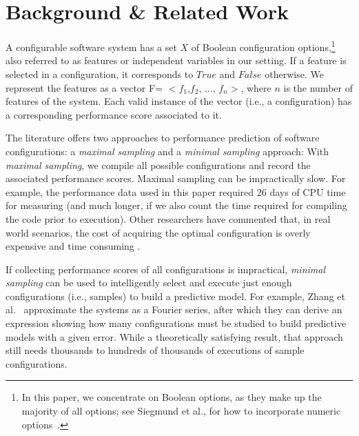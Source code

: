\documentclass{sig-alternative}
\begin{document}


\section{Background \& Related Work}  
\label{sect:addit}

A configurable software system has a set $X$ of Boolean configuration options,\footnote{In this paper, we concentrate on Boolean options, as they make up the majority of all options; see Siegmund et al., for how to incorporate numeric options~\cite{SGA+15}.} also referred to as features or independent variables in our setting. 
If a feature is selected in a configuration, it corresponds to $\mathit{True}$ and $\mathit{False}$ otherwise. We represent the features as a vector F=  $<f_1$,$f_2$, ..., $f_n>$, where $n$ is the number of features of the system. Each valid instance of the vector (i.e., a configuration) has a corresponding performance score associated to it. 

The literature offers two approaches to performance prediction of software configurations: a {\em maximal sampling} and a {\em minimal sampling} approach: 
With {\em maximal sampling}, we compile all  possible configurations and record the associated performance scores. 
Maximal sampling  can be impractically slow. For example, the performance data used in this paper required  26 days of CPU time for measuring (and much longer, if we also count the time required for compiling the code prior to execution). 
 Other researchers have commented that,  in 
 real world scenarios, the cost of acquiring the optimal configuration is overly expensive and time consuming \cite{weiss2008maximizing}.
 
 If collecting performance scores of all configurations is impractical,  {\em minimal sampling} 
 can be used to intelligently select and execute just enough configurations (i.e., samples) to build a
 predictive model.
 For example, Zhang et al.~\cite{zhang2015performance} approximate the
 systems as a Fourier series, after which they can derive an expression showing how many configurations must be studied
 to build predictive models with a given error. While a theoretically satisfying result, that approach still needs thousands to hundreds of thousands of executions of sample
 configurations.  
\end{document}
